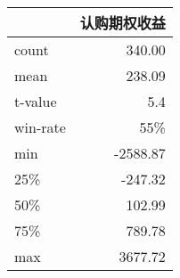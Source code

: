 \begin{tabular}{lr}
\toprule
{} &   认购期权收益 \\
\midrule
count &   340.00 \\
mean  &   238.09 \\
t-value   &   5.4 \\
win-rate & 55\%  \\
min   & -2588.87 \\
25\%   &  -247.32 \\
50\%   &   102.99 \\
75\%   &   789.78 \\
max   &  3677.72 \\
\bottomrule 
\end{tabular}
